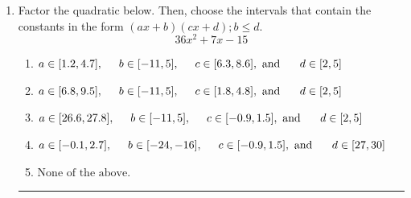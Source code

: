 \documentclass[14pt]{extbook}
\newcommand{\litem}[1]{\item#1\hspace*{-1cm}\rule{\textwidth}{0.4pt}}
\begin{document}
\begin{enumerate}
{\begin{enumerate}[label=\Alph*.]
\end{enumerate} }
\litem{
Factor the quadratic below. Then, choose the intervals that contain the constants in the form $(ax+b)(cx+d); b \leq d.$\[ 36x^{2} +7 x -15 \]\begin{enumerate}[label=\Alph*.]
\item \( a \in [1.2, 4.7], \hspace*{5mm} b \in [-11, 5], \hspace*{5mm} c \in [6.3, 8.6], \text{ and } \hspace*{5mm} d \in [2, 5] \)
\item \( a \in [6.8, 9.5], \hspace*{5mm} b \in [-11, 5], \hspace*{5mm} c \in [1.8, 4.8], \text{ and } \hspace*{5mm} d \in [2, 5] \)
\item \( a \in [26.6, 27.8], \hspace*{5mm} b \in [-11, 5], \hspace*{5mm} c \in [-0.9, 1.5], \text{ and } \hspace*{5mm} d \in [2, 5] \)
\item \( a \in [-0.1, 2.7], \hspace*{5mm} b \in [-24, -16], \hspace*{5mm} c \in [-0.9, 1.5], \text{ and } \hspace*{5mm} d \in [27, 30] \)
\item \( \text{None of the above.} \)

\end{enumerate} }
\end{enumerate}
\end{document}
